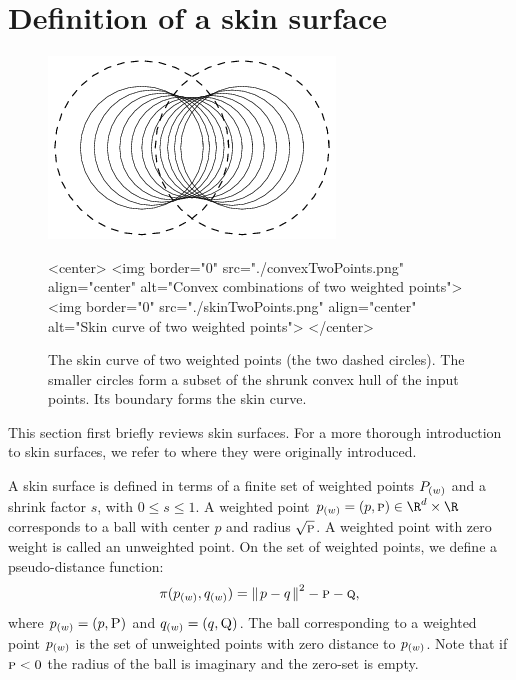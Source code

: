 
\section{Definition of a skin surface}
\label{sec:skindefinition}

\begin{figure}
  \begin{ccTexOnly}
    \begin{center}
      \includegraphics[width=.25\textwidth]{Skin_surface_3/skinTwoPoints}
    \end{center}
  \end{ccTexOnly}
  \begin{ccHtmlOnly}
    <center>
    <img border="0" src="./convexTwoPoints.png" align="center" alt="Convex combinations of two weighted points">
    <img border="0" src="./skinTwoPoints.png" align="center" alt="Skin
    curve of two weighted points">
    </center>
  \end{ccHtmlOnly}
  \caption{\label{fig:twoPoints} The skin curve of two weighted points
    (the two dashed circles). The smaller circles form a subset of the
    shrunk convex hull of the input points. Its boundary forms the skin
    curve. }
\end{figure}

This section first briefly reviews skin surfaces. For a more thorough
introduction to skin surfaces, we refer to \cite{cgal:e-dssd-99} where
they were originally introduced.

A skin surface is defined in terms of a finite set of weighted points
${P}_{(w)}$ and a shrink factor $s$, with $0\leq s\leq 1$. A weighted
point $\ssWpoint{p}=({p},\textsc{p})\in \R^d\times\R$ corresponds to a ball
with center ${p}$ and radius $\sqrt{\textsc{p}}$. A weighted point
with zero weight is called an unweighted point. On the set of weighted
points, we define a pseudo-distance function:
\[
  \pi({p}_{(w)},{q}_{(w)}) = {\parallel\! p-q \!\parallel}^2 - \textsc{p} - \textsc{q},
\]
where ${p}_{(w)} = (p,\textsc{P})$ and ${q}_{(w)} = (q,\textsc{Q})$.  The
ball corresponding to a weighted point ${p}_{(w)}$ is the set of
unweighted points with zero distance to ${p}_{(w)}$. Note that if
$\textsc{p}<0$ the radius of the ball is imaginary and the zero-set is
empty.

